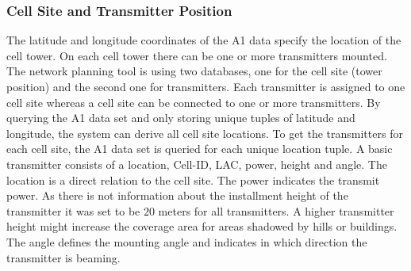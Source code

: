 \documentclass[master,english]{hgbthesis}
\begin{document}
\subsubsection{Cell Site and Transmitter Position}
The latitude and longitude coordinates of the A1 data specify the location of the cell tower. On each cell tower there can be one or more transmitters mounted. The network planning tool is using two databases, one for the cell site (tower position) and the second one for transmitters. Each transmitter is assigned to one cell site whereas a cell site can be connected to one or more transmitters.
By querying the A1 data set and only storing unique tuples of latitude and longitude, the system can derive all cell site locations. To get the transmitters for each cell site, the A1 data set is queried for each unique location tuple. A basic transmitter consists of a location, Cell-ID, LAC, power, height and angle. The location is a direct relation to the cell site. The power indicates the transmit power. As there is not information about the installment height of the transmitter it was set to be $20$ meters for all transmitters. A higher transmitter height might increase the coverage area for areas shadowed by hills or buildings. The angle defines the mounting angle and indicates in which direction the transmitter is beaming.
\end{document}
